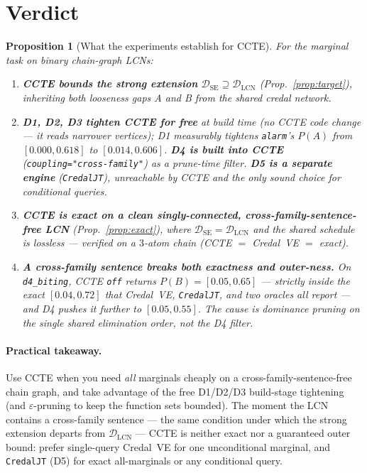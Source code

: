 \documentclass[11pt]{article}
\newtheorem{proposition}{Proposition}
\newcommand{\DSE}{\mathcal{D}_{\mathrm{SE}}}
\newcommand{\DLCN}{\mathcal{D}_{\mathrm{LCN}}}
\begin{document}
\section{Verdict}\label{sec:verdict}

\begin{proposition}[What the experiments establish for CCTE]\label{prop:verdict}
For the marginal task on binary chain-graph LCNs:
\begin{enumerate}
  \item[\textnormal{(i)}] \textbf{CCTE bounds the strong extension} $\DSE\supseteq\DLCN$
    (Prop.~\ref{prop:target}), inheriting both looseness gaps A and B from the shared credal
    network.
  \item[\textnormal{(ii)}] \textbf{D1, D2, D3 tighten CCTE for free} at build time (no CCTE code
    change --- it reads narrower vertices); D1 measurably tightens \texttt{alarm}'s $P(A)$ from
    $[0.000,0.618]$ to $[0.014,0.606]$. \textbf{D4 is built into CCTE}
    (\texttt{coupling="cross-family"}) as a prune-time filter. \textbf{D5 is a separate engine}
    (\texttt{CredalJT}), unreachable by CCTE and the only sound choice for conditional queries.
  \item[\textnormal{(iii)}] \textbf{CCTE is exact on a clean singly-connected,
    cross-family-sentence-free LCN} (Prop.~\ref{prop:exact}), where $\DSE=\DLCN$ and the shared
    schedule is lossless --- verified on a $3$-atom chain (CCTE $=$ Credal~VE $=$ exact).
  \item[\textnormal{(iv)}] \textbf{A cross-family \emph{sentence} breaks both exactness and
    outer-ness.} On \texttt{d4\_biting}, CCTE \texttt{off} returns $P(B)=[0.05,0.65]$ ---
    strictly \emph{inside} the exact $[0.04,0.72]$ that Credal~VE, \texttt{CredalJT}, and two
    oracles all report --- and D4 pushes it further to $[0.05,0.55]$. The cause is dominance
    pruning on the single shared elimination order, not the D4 filter.
\end{enumerate}
\end{proposition}

\paragraph{Practical takeaway.} Use CCTE when you need \emph{all} marginals cheaply on a
cross-family-sentence-free chain graph, and take advantage of the free D1/D2/D3 build-stage
tightening (and $\varepsilon$-pruning to keep the function sets bounded). The moment the LCN
contains a cross-family sentence --- the same condition under which the strong extension departs
from $\DLCN$ --- CCTE is neither exact nor a guaranteed outer bound: prefer single-query
Credal~VE for one unconditional marginal, and \texttt{CredalJT} (D5) for exact all-marginals or
any conditional query.
\end{document}
